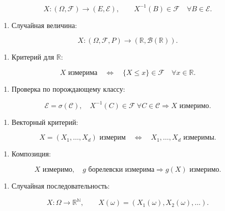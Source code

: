 \documentclass[
  11pt,
  a4paper,
]{article}
\providecommand{\tightlist}{%
  \setlength{\itemsep}{0pt}\setlength{\parskip}{0pt}}
\begin{document}
\[
X:(\Omega,\mathcal F)\to(E,\mathcal E),
\qquad
X^{-1}(B)\in\mathcal F\quad \forall B\in\mathcal E.
\]

\begin{enumerate}
\def\labelenumi{\arabic{enumi}.}
\setcounter{enumi}{1}
\tightlist
\item
  Случайная величина:
\end{enumerate}

\[
X:(\Omega,\mathcal F,P)\to(\mathbb R,\mathcal B(\mathbb R)).
\]

\begin{enumerate}
\def\labelenumi{\arabic{enumi}.}
\setcounter{enumi}{2}
\tightlist
\item
  Критерий для \(\mathbb R\):
\end{enumerate}

\[
X\text{ измерима}
\quad\Longleftrightarrow\quad
\{X\le x\}\in\mathcal F\quad \forall x\in\mathbb R.
\]

\begin{enumerate}
\def\labelenumi{\arabic{enumi}.}
\setcounter{enumi}{3}
\tightlist
\item
  Проверка по порождающему классу:
\end{enumerate}

\[
\mathcal E=\sigma(\mathcal C),\quad
X^{-1}(C)\in\mathcal F\ \forall C\in\mathcal C
\Rightarrow
X\text{ измеримо}.
\]

\begin{enumerate}
\def\labelenumi{\arabic{enumi}.}
\setcounter{enumi}{4}
\tightlist
\item
  Векторный критерий:
\end{enumerate}

\[
X=(X_1,\ldots,X_d)\text{ измерим}
\quad\Longleftrightarrow\quad
X_1,\ldots,X_d\text{ измеримы}.
\]

\begin{enumerate}
\def\labelenumi{\arabic{enumi}.}
\setcounter{enumi}{5}
\tightlist
\item
  Композиция:
\end{enumerate}

\[
X\text{ измеримо},\quad g\text{ борелевски измерима}
\Rightarrow
g(X)\text{ измеримо}.
\]

\begin{enumerate}
\def\labelenumi{\arabic{enumi}.}
\setcounter{enumi}{6}
\tightlist
\item
  Случайная последовательность:
\end{enumerate}

\[
X:\Omega\to\mathbb R^{\mathbb N},
\qquad
X(\omega)=(X_1(\omega),X_2(\omega),\ldots).
\]
\end{document}

